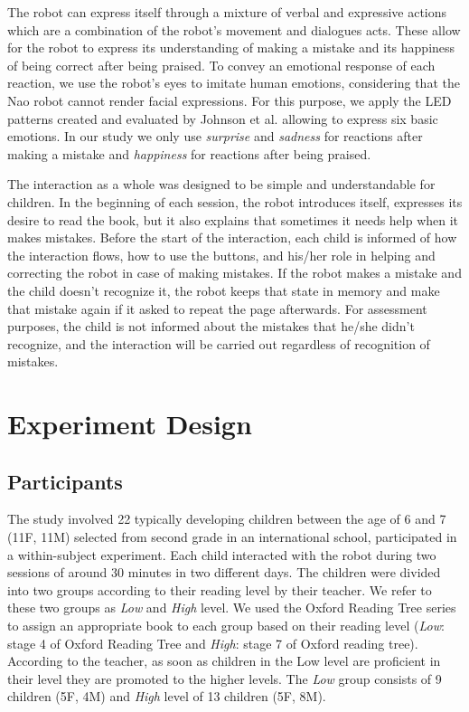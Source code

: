 \documentclass{sigchi}
\begin{document}
The robot can express itself through a mixture of verbal and expressive actions which are a combination of the robot's movement and dialogues acts. These allow for the robot to express its understanding of making a mistake and its happiness of being correct after being praised.
To convey an emotional response of each reaction, we use the robot's eyes to imitate human emotions, considering that the Nao robot cannot render facial expressions. 
For this purpose, we apply the LED patterns created and evaluated by Johnson et al. \cite{johnson2013imitating} allowing to express six basic emotions. In our study we only use \emph{surprise} and \emph{sadness} for reactions after making a mistake and \emph{happiness} for reactions after being praised.

The interaction as a whole was designed to be simple and understandable for children. 
In the beginning of each session, the robot introduces itself, expresses its desire to read the book, but it also explains that sometimes it needs help when it makes mistakes. 
Before the start of the interaction, each child is informed of how the interaction flows, how to use the buttons, and his/her role in helping and correcting the robot in case of making mistakes.
If the robot makes a mistake and the child doesn't recognize it, the robot keeps that state in memory and make that mistake again if it asked to repeat the page afterwards.
For assessment purposes, the child is not informed about the mistakes that he/she didn't recognize, and the interaction will be carried out regardless of recognition of mistakes.


\section{Experiment Design}
\subsection{Participants}
The study involved 22 typically developing children between the age of 6 and 7 (11F, 11M) selected from second grade in an international school, participated in a within-subject experiment. Each child interacted with the robot during two sessions of around 30 minutes in two different days. 
The children were divided into two groups according to their reading level by their teacher. We refer to these two groups as \textit{Low} and \textit{High} level. 
We used the Oxford Reading Tree series to assign an appropriate book to each group based on their reading level (\textit{Low}: stage 4 of Oxford Reading Tree and \textit{High}: stage 7 of Oxford reading tree). 
According to the teacher, as soon as children in the Low level are proficient in their level they are promoted to the higher levels.
The \textit{Low} group consists of 9 children (5F, 4M) and \textit{High} level of 13 children (5F, 8M).
\end{document}
